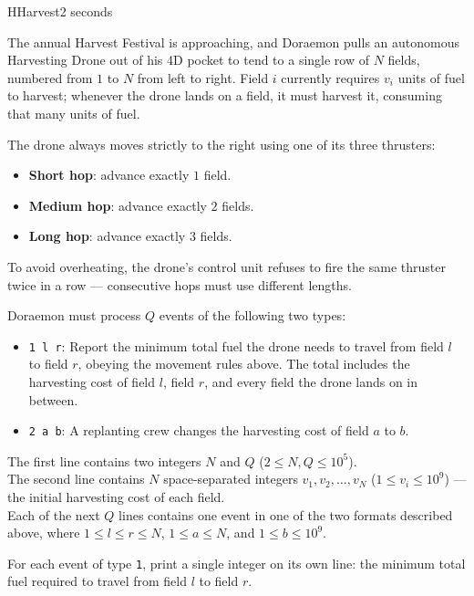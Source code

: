 \begin{problem}{H}{Harvest}{2 seconds}

\noindent
The annual Harvest Festival is approaching, and Doraemon pulls an autonomous Harvesting Drone out of his 4D pocket to tend to a single row of $N$ fields, numbered from $1$ to $N$ from left to right. Field $i$ currently requires $v_i$ units of fuel to harvest; whenever the drone lands on a field, it must harvest it, consuming that many units of fuel.

The drone always moves strictly to the right using one of its three thrusters:
\begin{itemize}
  \item \textbf{Short hop}: advance exactly $1$ field.
  \item \textbf{Medium hop}: advance exactly $2$ fields.
  \item \textbf{Long hop}: advance exactly $3$ fields.
\end{itemize}
To avoid overheating, the drone's control unit refuses to fire the same thruster twice in a row --- consecutive hops must use different lengths.

Doraemon must process $Q$ events of the following two types:
\begin{itemize}
  \item \texttt{1 l r}: Report the minimum total fuel the drone needs to travel from field $l$ to field $r$, obeying the movement rules above. The total includes the harvesting cost of field $l$, field $r$, and every field the drone lands on in between.
  \item \texttt{2 a b}: A replanting crew changes the harvesting cost of field $a$ to $b$.
\end{itemize}

\InputFile

\noindent
The first line contains two integers $N$ and $Q$ ($2 \le N, Q \le 10^5$).\\
The second line contains $N$ space-separated integers $v_1, v_2, \ldots, v_N$ ($1 \le v_i \le 10^9$) --- the initial harvesting cost of each field.\\
Each of the next $Q$ lines contains one event in one of the two formats described above, where $1 \le l \le r \le N$, $1 \le a \le N$, and $1 \le b \le 10^9$.

\OutputFile

\noindent
For each event of type \texttt{1}, print a single integer on its own line: the minimum total fuel required to travel from field $l$ to field $r$.

\Examples

\begin{example}
\end{example}

\pagebreak

\end{problem}
